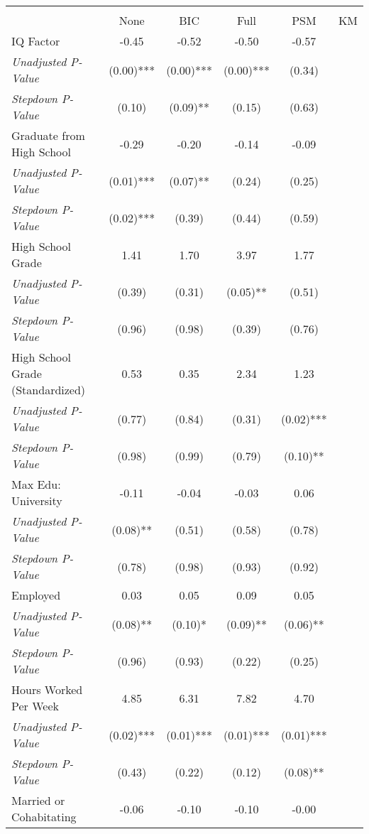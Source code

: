 \begin{tabular}{l c c c c c}
\toprule
&  \\
 & None & BIC & Full & PSM & KM \\
\midrule
IQ Factor & -0.45 & -0.52 & -0.50 & -0.57 & \\
\quad \textit{Unadjusted P-Value} & (0.00)*** & (0.00)*** & (0.00)*** & (0.34) & \\
\quad \textit{Stepdown P-Value} & (0.10) & (0.09)** & (0.15) & (0.63) & \\
Graduate from High School & -0.29 & -0.20 & -0.14 & -0.09 & \\
\quad \textit{Unadjusted P-Value} & (0.01)*** & (0.07)** & (0.24) & (0.25) & \\
\quad \textit{Stepdown P-Value} & (0.02)*** & (0.39) & (0.44) & (0.59) & \\
High School Grade & 1.41 & 1.70 & 3.97 & 1.77 & \\
\quad \textit{Unadjusted P-Value} & (0.39) & (0.31) & (0.05)** & (0.51) & \\
\quad \textit{Stepdown P-Value} & (0.96) & (0.98) & (0.39) & (0.76) & \\
High School Grade (Standardized) & 0.53 & 0.35 & 2.34 & 1.23 & \\
\quad \textit{Unadjusted P-Value} & (0.77) & (0.84) & (0.31) & (0.02)*** & \\
\quad \textit{Stepdown P-Value} & (0.98) & (0.99) & (0.79) & (0.10)** & \\
Max Edu: University & -0.11 & -0.04 & -0.03 & 0.06 & \\
\quad \textit{Unadjusted P-Value} & (0.08)** & (0.51) & (0.58) & (0.78) & \\
\quad \textit{Stepdown P-Value} & (0.78) & (0.98) & (0.93) & (0.92) & \\
Employed & 0.03 & 0.05 & 0.09 & 0.05 & \\
\quad \textit{Unadjusted P-Value} & (0.08)** & (0.10)* & (0.09)** & (0.06)** & \\
\quad \textit{Stepdown P-Value} & (0.96) & (0.93) & (0.22) & (0.25) & \\
Hours Worked Per Week & 4.85 & 6.31 & 7.82 & 4.70 & \\
\quad \textit{Unadjusted P-Value} & (0.02)*** & (0.01)*** & (0.01)*** & (0.01)*** & \\
\quad \textit{Stepdown P-Value} & (0.43) & (0.22) & (0.12) & (0.08)** & \\
Married or Cohabitating & -0.06 & -0.10 & -0.10 & -0.00 & \\

\end{tabular}
